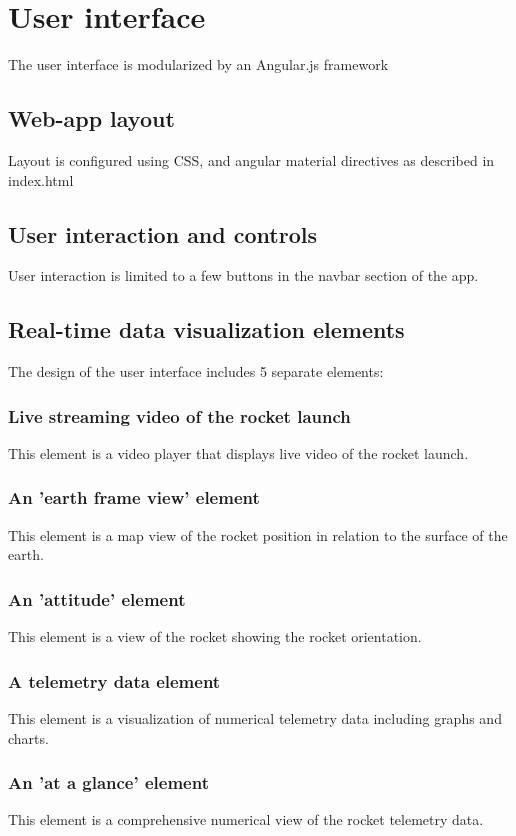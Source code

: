 \section{User interface}
The user interface is modularized by an Angular.js framework


\subsection{Web-app layout}
Layout is configured using CSS, and angular material directives as described in index.html

\subsection{User interaction and controls}
User interaction is limited to a few buttons in the navbar section of the app.



\subsection{Real-time data visualization elements}
  The design of the user interface includes 5 separate elements:
  \subsubsection{Live streaming video of the rocket launch}
    This element is a video player that displays live video of the rocket launch.
  \subsubsection{An 'earth frame view' element}
    This element is a map view of the rocket position in relation to the surface
	of the earth.
  \subsubsection{An 'attitude' element}
    This element is a view of the rocket showing the rocket orientation.
  \subsubsection{A telemetry data element}
    This element is a visualization of numerical telemetry data including graphs
	and charts.
  \subsubsection{An 'at a glance' element}
    This element is a comprehensive numerical view of the rocket telemetry data.

